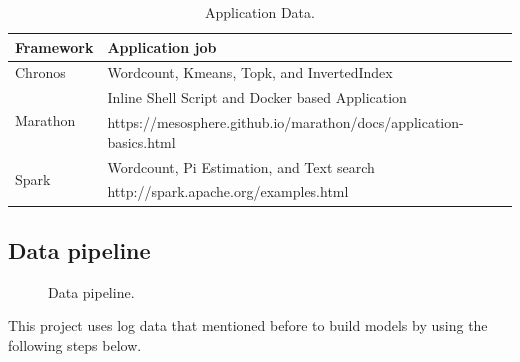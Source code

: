 \documentclass[12pt,oneside,openright,a4paper]{cpe-english-project}
\begin{document}
\begin{table}[!h]
  \caption{Application Data.}\label{tbl:ApplicationData}
    \begin{tabular}{@{}|p{}|p{}|}
    \hline
    \textbf{Framework} & \textbf{Application job}\\
    \hline
    Chronos & Wordcount, Kmeans, Topk, and InvertedIndex\\
    \hline
    \multirow{2}{*}{Marathon} & Inline Shell Script and Docker based Application \\
    & https://mesosphere.github.io/marathon/docs/application-basics.html\\
    \hline
    \multirow{2}{*}{Spark} & Wordcount, Pi Estimation, and Text search\\
    & http://spark.apache.org/examples.html\\
    \hline
  \end{tabular}
\end{table}

\newpage

\subsection{Data pipeline}

\begin{figure}[!h]\centering
  \setlength{\fboxrule}{0mm} %
  \setlength{\fboxsep}{0cm}
  \caption{Data pipeline.}\label{fig:dataPipeline}
\end{figure}

This project uses log data that mentioned before to build models by using the following steps below.
\end{document}
